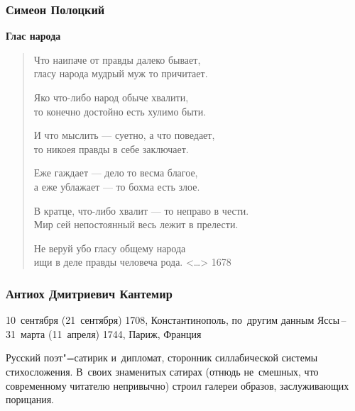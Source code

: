 \documentclass{beamer}
\begin{document}

\begin{frame}
\frametitle{Симеон Полоцкий}

\begin{center}
\textbf{Глас народа}
\end{center}

\begin{verse}
{\small Что наипаче от правды далеко бывает,\\
гласу народа мудрый муж то причитает.

Яко что-либо народ обыче хвалити,\\
то конечно достойно есть хулимо быти.

И что мыслить — суетно, а что поведает,\\
то никоея правды в себе заключает.

Еже гаждает — дело то весма благое,\\
а еже ублажает — то бохма есть злое.

В кратце, что-либо хвалит — то неправо в чести.\\
Мир сей непостоянный весь лежит в прелести.

Не веруй убо гласу общему народа\\
ищи в деле правды человеча рода. <\dots> 1678
}
\end{verse}

\end{frame}


\begin{frame}
\frametitle{Антиох Дмитриевич Кантемир}

\begin{flushleft}
10~сентября (21~сентября) 1708, Константинополь, по~другим данным Яссы\,--\,31~марта (11~апреля) 1744, Париж, Франция

Русский поэт"=сатирик и~дипломат, сторонник силлабической системы стихосложения. В~своих знаменитых сатирах (отнюдь не~смешных, что современному читателю непривычно) строил галереи образов, заслуживающих порицания.
\end{flushleft}


\end{frame}

\end{document}
